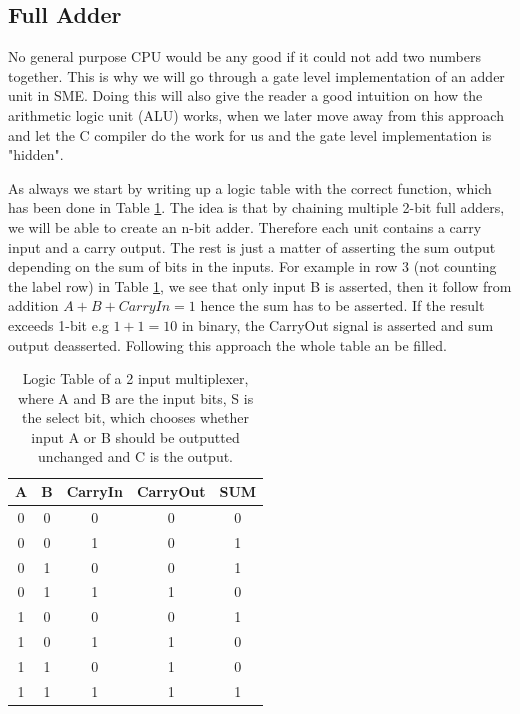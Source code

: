     \subsection{Full Adder}
        No general purpose CPU would be any good if it could not add two numbers together. This is why we will go through a gate level implementation of an adder unit in SME. Doing this will also give the reader a good intuition on how the arithmetic logic unit (ALU) works, when we later move away from this approach and let the C compiler do the work for us and the gate level implementation is "hidden".
        
        As always we start by writing up a logic table with the correct function, which has been done in Table \ref{LogicTable:1BitFullAdder}. The idea is that by chaining multiple 2-bit full adders, we will be able to create an n-bit adder. Therefore each unit contains a carry input and a carry output. The rest is just a matter of asserting the sum output depending on the sum of bits in the inputs. For example in row 3 (not counting the label row) in Table \ref{LogicTable:1BitFullAdder}, we see that only input B is asserted, then it follow from addition $A+B+CarryIn=1$ hence the sum has to be asserted. If the result exceeds 1-bit e.g $1+1=10$ in binary, the CarryOut signal is asserted and sum output deasserted. Following this approach the whole table an be filled.
        
        \begin{table}[h!]
            \centering
            \begin{tabular}{|c|c|c||c|c|}
                \hline
                \textbf{A} & \textbf{B} & \textbf{CarryIn} & \textbf{CarryOut} & \textbf{SUM} \\ \hline
                0      &     0      &        0         &         0         &      0       \\ \hline
                0      &     0      &        1         &         0         &      1       \\ \hline
                0      &     1      &        0         &         0         &      1       \\ \hline
                0      &     1      &        1         &         1         &      0       \\ \hline
                1      &     0      &        0         &         0         &      1       \\ \hline
                1      &     0      &        1         &         1         &      0       \\ \hline
                1      &     1      &        0         &         1         &      0       \\ \hline
                1      &     1      &        1         &         1         &      1       \\ \hline
            \end{tabular}
            \caption{Logic Table of a 2 input multiplexer, where A and B are the input bits, S is the select bit, which chooses whether input A or B should be outputted unchanged and C is the output. }
            \label{LogicTable:1BitFullAdder}
        \end{table}
        
